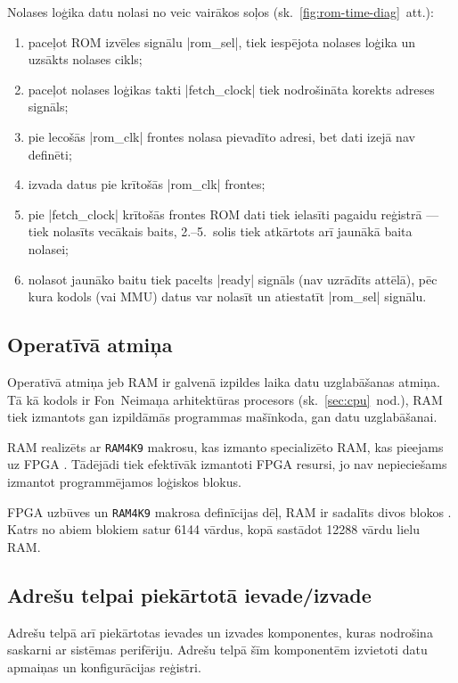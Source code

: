 	\pagebreak[2]
	Nolases loģika datu nolasi no  veic vairākos soļos (sk.~\ref{fig:rom-time-diag}~att.):
	\begin{enumerate}
		\item paceļot ROM izvēles signālu |rom_sel|, tiek iespējota nolases
			loģika un uzsākts nolases cikls;
		\item paceļot nolases loģikas takti |fetch_clock| 
			tiek nodrošināta korekts adreses signāls;
		\item pie lecošās |rom_clk| frontes  nolasa pievadīto adresi,
			bet dati izejā nav definēti;
		\item {} izvada datus pie krītošās |rom_clk|	frontes;
		\item pie |fetch_clock| krītošās frontes ROM dati tiek ielasīti
			pagaidu reģistrā --- tiek nolasīts vecākais baits, 
			2.--5.~solis tiek atkārtots arī jaunākā baita nolasei;
		\item nolasot jaunāko baitu tiek pacelts |ready| signāls
			(nav uzrādīts attēlā), pēc kura kodols (vai MMU) datus var
			nolasīt un atiestatīt |rom_sel| signālu.
	\end{enumerate}
	
	

\subsection{Operatīvā atmiņa} \label{sec:ram}
	Operatīvā atmiņa jeb RAM ir galvenā izpildes laika datu uzglabāšanas
	atmiņa. Tā kā kodols ir Fon~Neimaņa arhitektūras procesors
	(sk.~\ref{sec:cpu}~nod.), RAM tiek izmantots gan izpildāmās
	programmas mašīnkoda, gan datu uzglabāšanai.
	
	RAM realizēts ar \texttt{RAM4K9} makrosu, kas izmanto specializēto
	RAM, kas pieejams uz  FPGA \cite{RAM4K9}.
	Tādējādi tiek
	efektīvāk izmantoti FPGA resursi, jo nav nepieciešams izmantot
	programmējamos loģiskos blokus.
	
	 FPGA uzbūves un \texttt{RAM4K9} makrosa
	definīcijas dēļ, RAM ir sadalīts divos blokos \cite{RAM4K9}. 
	Katrs no abiem blokiem satur 6144 vārdus,
	kopā sastādot 12288 vārdu lielu RAM.
	
	

\clearpage
\subsection{Adrešu telpai piekārtotā ievade/izvade}
	Adrešu telpā arī piekārtotas ievades un izvades komponentes,
	kuras nodrošina saskarni ar sistēmas perifēriju. Adrešu telpā šīm
	komponentēm izvietoti datu apmaiņas un konfigurācijas reģistri.
	

